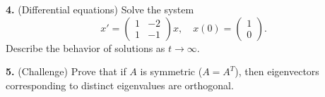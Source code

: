\documentclass{amsart}
\begin{document}
\bigskip

\textbf{4.} (Differential equations) Solve the system
\[
x' = \begin{pmatrix}1&-2\\1&-1\end{pmatrix}x,\quad x(0)=\begin{pmatrix}1\\0\end{pmatrix}.
\]
Describe the behavior of solutions as $t \to \infty$.

\bigskip

\textbf{5.} (Challenge) Prove that if $A$ is symmetric ($A = A^T$), then eigenvectors corresponding to distinct eigenvalues are orthogonal.
\end{document}
